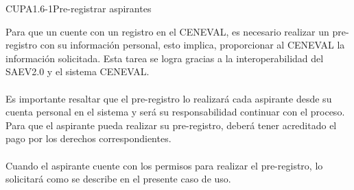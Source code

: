 
\begin{UseCase}{CUPA1.6-1}{Pre-registrar aspirantes}
    {
    	Para que un  cuente con un registro en el CENEVAL, es necesario realizar un pre-registro con su información personal, esto implica, proporcionar al CENEVAL la información solicitada. Esta tarea se logra gracias a la interoperabilidad del SAEV2.0 y el sistema CENEVAL.\\
    	\\
    	Es importante resaltar que el pre-registro lo realizará cada aspirante desde su cuenta personal en el sistema y será su responsabilidad continuar con el proceso. Para que el aspirante pueda realizar su pre-registro, deberá tener acreditado el pago por los derechos correspondientes.\\
    	\\
    	Cuando el aspirante cuente con los permisos para realizar el pre-registro, lo solicitará como se describe en el presente caso de uso.
    
}
    

    



\end{UseCase}
